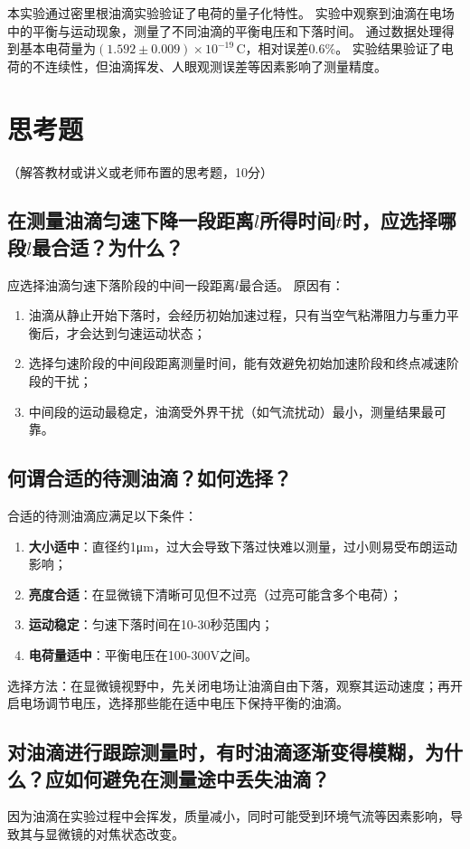 \documentclass[10pt,a4paper]{ctexart}
\newcommand{\xiaosi}{\fontsize{12pt}{16pt}\selectfont}
\begin{document}
本实验通过密里根油滴实验验证了电荷的量子化特性。
实验中观察到油滴在电场中的平衡与运动现象，测量了不同油滴的平衡电压和下落时间。
通过数据处理得到基本电荷量为$(1.592 \pm 0.009) \times 10^{-19} \, \text{C}$，相对误差0.6\%。
实验结果验证了电荷的不连续性，但油滴挥发、人眼观测误差等因素影响了测量精度。
\section{思考题}

    \xiaosi （解答教材或讲义或老师布置的思考题，10分）

\subsection{在测量油滴匀速下降一段距离$l$所得时间$t$时，应选择哪段$l$最合适？为什么？}
应选择油滴匀速下落阶段的中间一段距离$l$最合适。
原因有：
\begin{enumerate}
    \item 油滴从静止开始下落时，会经历初始加速过程，只有当空气粘滞阻力与重力平衡后，才会达到匀速运动状态；
    \item 选择匀速阶段的中间段距离测量时间，能有效避免初始加速阶段和终点减速阶段的干扰；
    \item 中间段的运动最稳定，油滴受外界干扰（如气流扰动）最小，测量结果最可靠。
\end{enumerate}
\subsection{何谓合适的待测油滴？如何选择？}
合适的待测油滴应满足以下条件：
\begin{enumerate}
    \item \textbf{大小适中}：直径约1μm，过大会导致下落过快难以测量，过小则易受布朗运动影响；
    \item \textbf{亮度合适}：在显微镜下清晰可见但不过亮（过亮可能含多个电荷）；
    \item \textbf{运动稳定}：匀速下落时间在10-30秒范围内；
    \item \textbf{电荷量适中}：平衡电压在100-300V之间。
\end{enumerate}

选择方法：在显微镜视野中，先关闭电场让油滴自由下落，观察其运动速度；再开启电场调节电压，选择那些能在适中电压下保持平衡的油滴。
\subsection{对油滴进行跟踪测量时，有时油滴逐渐变得模糊，为什么？应如何避免在测量途中丢失油滴？}
因为油滴在实验过程中会挥发，质量减小，同时可能受到环境气流等因素影响，导致其与显微镜的对焦状态改变。
\end{document}
